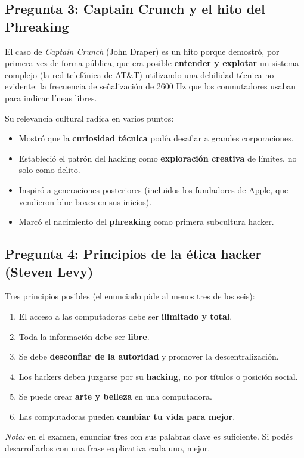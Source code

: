 \documentclass[11pt,a4paper]{article}
\begin{document}
\subsection*{Pregunta 3: Captain Crunch y el hito del Phreaking}
\begin{respuesta}
El caso de \textit{Captain Crunch} (John Draper) es un hito porque demostró, por primera vez de forma pública, que era posible \textbf{entender y explotar} un sistema complejo (la red telefónica de AT\&T) utilizando una debilidad técnica no evidente: la frecuencia de señalización de 2600 Hz que los conmutadores usaban para indicar líneas libres.

Su relevancia cultural radica en varios puntos:
\begin{itemize}[leftmargin=*]
  \item Mostró que la \textbf{curiosidad técnica} podía desafiar a grandes corporaciones.
  \item Estableció el patrón del hacking como \textbf{exploración creativa} de límites, no solo como delito.
  \item Inspiró a generaciones posteriores (incluidos los fundadores de Apple, que vendieron blue boxes en sus inicios).
  \item Marcó el nacimiento del \textbf{phreaking} como primera subcultura hacker.
\end{itemize}
\end{respuesta}

\subsection*{Pregunta 4: Principios de la ética hacker (Steven Levy)}
\begin{respuesta}
Tres principios posibles (el enunciado pide al menos tres de los seis):

\begin{enumerate}[leftmargin=*]
  \item El acceso a las computadoras debe ser \textbf{ilimitado y total}.
  \item Toda la información debe ser \textbf{libre}.
  \item Se debe \textbf{desconfiar de la autoridad} y promover la descentralización.
  \item Los hackers deben juzgarse por su \textbf{hacking}, no por títulos o posición social.
  \item Se puede crear \textbf{arte y belleza} en una computadora.
  \item Las computadoras pueden \textbf{cambiar tu vida para mejor}.
\end{enumerate}

\textit{Nota:} en el examen, enunciar tres con sus palabras clave es suficiente. Si podés desarrollarlos con una frase explicativa cada uno, mejor.
\end{respuesta}
\end{document}
